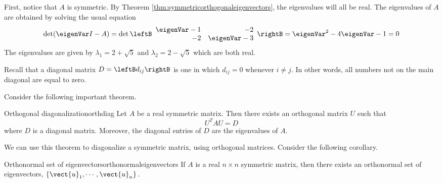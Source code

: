 \begin{solution}
First, notice that $A$ is symmetric. By Theorem \ref{thm:symmetricorthogonaleigenvectors}, the eigenvalues will all be real. The eigenvalues of $A$ are obtained by solving the usual equation 
\[
\det (\eigenVar I - A) = 
\det \leftB
\begin{array}{rr}
\eigenVar - 1 & -2 \\ 
-2 & \eigenVar - 3 
\end{array}
\rightB = \eigenVar^2 -4\eigenVar -1=0
\]
The eigenvalues are given by $\lambda_1 =2+
\sqrt{5}$ and $\lambda_2 =2-\sqrt{5}$ which are both real. 
\end{solution}

Recall that a diagonal matrix $D=\leftB d_{ij} \rightB$ is one in which $d_{ij} = 0$ whenever $i \neq j$. In other words, all numbers not on the main diagonal are equal to zero. 

Consider the following important theorem.

\begin{theorem}{Orthogonal diagonalization}{orthdiag}
Let $A$ be a real symmetric matrix. Then there exists an
orthogonal matrix $U$ such that 
\[
U^{T}AU = D
\]
where $D$ is a diagonal matrix. Moreover,
the diagonal entries of $D$ are the eigenvalues of $A$.
\end{theorem}

We can use this theorem to diagonalize a symmetric matrix, using orthogonal matrices. Consider the following corollary.

\begin{corollary}{Orthonormal set of eigenvectors}{orthonormaleigenvectors}
If $A$ is a real $n\times n$ symmetric matrix, then there exists an
orthonormal set of eigenvectors, $\left\{ \vect{u}_{1},\cdots ,\vect{u}
_{n}\right\} .$
\end{corollary}

